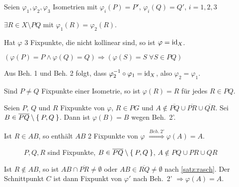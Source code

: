 \begin{beweis}
    Seien $\varphi_1, \varphi_2, \varphi_3$ Isometrien mit
    $\varphi_i(P) = P'$, $\varphi_i(Q) = Q'$, $i=1,2,3$

    \begin{behauptung}[1]
        $\exists R \in X \setminus PQ$ mit $\varphi_{1} (R) = \varphi_{2} (R)$.
    \end{behauptung}
    \begin{behauptung}[2]
        Hat $\varphi$ 3 Fixpunkte, die nicht kollinear sind,
        so ist $\varphi = \textnormal{id}_X$.
    \end{behauptung}

    \begin{behauptung}[2']
        $(\varphi(P) = P \land \varphi(Q) = Q) \Rightarrow (\varphi(S) = S\;\forall S \in PQ)$
    \end{behauptung}

    Aus Beh. 1 und Beh. 2 folgt, dass $\varphi_2^{-1} \circ \varphi_1 = \textnormal{id}_X$,
    also $\varphi_2 = \varphi_1$.

    \begin{beweis}\leavevmode
        \begin{behauptung}
            Sind $P \neq Q$ Fixpunkte einer Isometrie, so ist 
            $\varphi(R) = R$ für jedes $R \in PQ$.
        \end{behauptung}
        \begin{beweis}
            Seien $P$, $Q$ und $R$ Fixpunkte von $\varphi$, $R \in PG$
            und $A \notin \overline{PQ} \cup \overline{PR} \cup \overline{QR}$.
            Sei $B \in \overline{PQ} \setminus \Set{P, Q}$. Dann ist
            $\varphi(B) = B$ wegen Beh.~2'.

            Ist $R \in AB$, so enthält $AB$ 2 Fixpunkte von $\varphi$
            $\overset{Beh.~2'}{\Rightarrow} \varphi(A) = A$.

            \begin{figure}[htp]
                \centering
                
                \caption{$P, Q, R$ sind Fixpunkte, $B \in \overline{PQ} \setminus \Set{P,Q}$, $A \notin PQ \cup PR \cup QR$}
                \label{fig:geometry-1}
            \end{figure}

            Ist $R \notin AB$, so ist $AB \cap \overline{PR} \neq \emptyset$
            oder $AB \in \overline{RQ} \neq \emptyset$ nach \cref{satz:rasch}.
            Der Schnittpunkt $C$ ist dann Fixpunkt von $\varphi'$
            nach Beh.~2' $\Rightarrow \varphi(A) = A$.
        \end{beweis}


\end{beweis}
\end{beweis}
